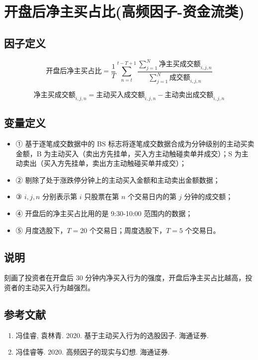\documentclass{article}
\begin{document}
\section{开盘后净主买占比(高频因子-资金流类)}

\subsection{因子定义}


\begin{equation}
    \text{开盘后净主买占比} = \frac{1}{T} \sum_{n=t}^{t-T+1} \frac{\sum_{j=1}^{N} \text{净主买成交额}_{i,j,n}}{\sum_{j=1}^{N} \text{成交额}_{i,j,n}}
\end{equation}

\begin{equation}
    \text{净主买成交额}_{i,j,n} = \text{主动买入成交额}_{i,j,n} - \text{主动卖出成交额}_{i,j,n}
\end{equation}

\subsection{变量定义}
\begin{itemize}
    \item ① 基于逐笔成交数据中的 BS 标志将逐笔成交数据合成为分钟级别的主动买卖金额，B 为主动买入（卖出方先挂单，买入方主动触碰卖单并成交）；S 为主动卖出（买入方先挂单，卖出方主动触碰买单并成交）；
    \item ② 剔除了处于涨跌停分钟上的主动买入金额和主动卖出金额数据；
    \item ③ \( i, j, n \) 分别表示第 \( i \) 只股票在第 \( n \) 个交易日内的第 \( j \) 分钟的成交额；
    \item ④ 开盘后的净主买占比用的是 9:30-10:00 范围内的数据；
    \item ⑤ 月度选股下，\( T=20 \) 个交易日；周度选股下，\( T=5 \) 个交易日。
\end{itemize}

\subsection{说明}
刻画了投资者在开盘后 30 分钟内净买入行为的强度，开盘后净主买占比越高，投资者的主动买入行为越强烈。

\subsection{参考文献}
\begin{enumerate}
    \item 冯佳睿, 袁林青. 2020. 基于主动买入行为的选股因子. 海通证券.
    \item 冯佳睿等. 2020. 高频因子的现实与幻想. 海通证券.
\end{enumerate}
\end{document}
